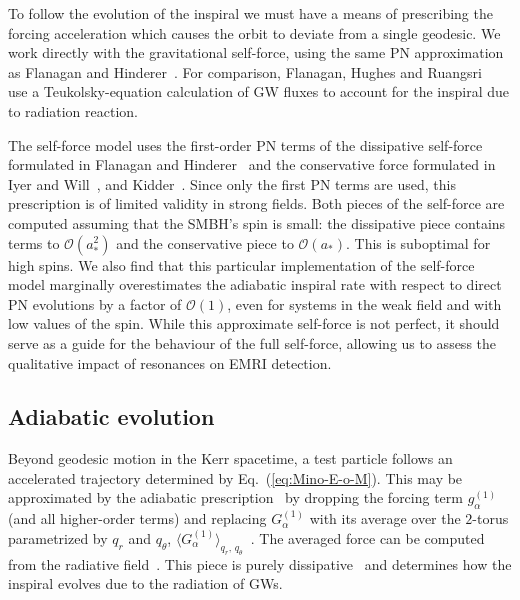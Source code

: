 \documentclass[aps,prd,amsfonts,amssymb,amsmath,nofootinbib,showpacs,superscriptaddress,twocolumn,floatfix]{revtex4-1}
\newcommand{\eqnref}[1]{Eq.~(\ref{eq:#1})}
\newcommand{\order}[1]{\ensuremath{\mathcal{O}({#1})}}
\begin{document}
To follow the evolution of the inspiral we must have a means of prescribing the forcing acceleration which causes the orbit to deviate from a single geodesic. We work directly with the gravitational self-force, using the same PN approximation as Flanagan and Hinderer~\cite{Flanagan2012}. For comparison, Flanagan, Hughes and Ruangsri~\cite{Flanagan2012a} use a Teukolsky-equation calculation of GW fluxes to account for the inspiral due to radiation reaction.

The self-force model uses the first-order PN terms of the dissipative self-force formulated in Flanagan and Hinderer~\cite{Flanagan2007} and the conservative force formulated in Iyer and Will~\cite{Iyer1993}, and Kidder~\cite{Kidder1995}. Since only the first PN terms are used, this prescription is of limited validity in strong fields. Both pieces of the self-force are computed assuming that the SMBH's spin is small: the dissipative piece contains terms to $\order{a_\ast^2}$ and the conservative piece to $\order{a_\ast}$. This is suboptimal for high spins. We also find that this particular implementation of the self-force model marginally overestimates the adiabatic inspiral rate with respect to direct PN evolutions by a factor of $\mathcal{O}(1)$, even for systems in the weak field and with low values of the spin. While this approximate self-force is not perfect, it should serve as a guide for the behaviour of the full self-force, allowing us to assess the qualitative impact of resonances on EMRI detection.


\subsection{Adiabatic evolution}
\label{sec:adiabatic}

Beyond geodesic motion in the Kerr spacetime, a test particle follows an accelerated trajectory determined by \eqnref{Mino-E-o-M}. This may be approximated by the adiabatic prescription~\cite{Hinderer2008} by dropping the forcing term $g_\alpha^{(1)}$ (and all higher-order terms) and replacing $G_\alpha^{(1)}$ with its average over the $2$-torus parametrized by $q_r$ and $q_\theta$, $\langle G_\alpha^{(1)}\rangle_{q_r,\,q_\theta}$~\cite{Drasco2005,Grossman2011}. The averaged force can be computed from the radiative field~\cite{Galtsov1982,Mino2003,Sago2006,Ganz2007}. This piece is purely dissipative~\cite{Pound2005} and determines how the inspiral evolves due to the radiation of GWs.
\end{document}
